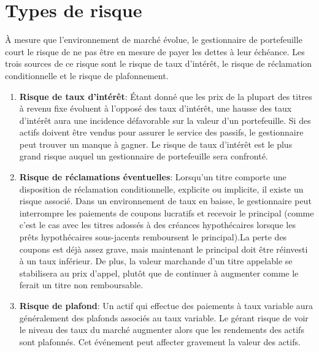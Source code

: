 \documentclass[12pt]{article}
\begin{document}
\section{Types de risque}
À mesure que l'environnement de marché évolue, le gestionnaire de portefeuille court le risque de ne pas être en mesure de payer les dettes à leur échéance. Les trois sources de ce risque sont le risque de taux d'intérêt, le risque de réclamation conditionnelle et le risque de plafonnement.
\begin{enumerate}
\item \textbf{Risque de taux d'intérêt}: Étant donné que les prix de la plupart des titres à revenu fixe évoluent à l'opposé des taux d'intérêt, une hausse des taux d'intérêt aura une incidence défavorable sur la valeur d'un portefeuille. Si des actifs doivent être vendus pour assurer le service des passifs, le gestionnaire peut trouver un manque à gagner. Le risque de taux d'intérêt est le plus grand risque auquel un gestionnaire de portefeuille sera confronté.
\item \textbf{Risque de réclamations éventuelles}: Lorsqu'un titre comporte une disposition de réclamation conditionnelle, explicite ou implicite, il existe un risque associé. Dans un environnement de taux en baisse, le gestionnaire peut interrompre les paiements de coupons lucratifs et recevoir le principal (comme c'est le cas avec les titres adossés à des créances hypothécaires lorsque les prêts hypothécaires sous-jacents remboursent le principal).La perte des coupons est déjà assez grave, mais maintenant le principal doit être réinvesti à un taux inférieur. De plus, la valeur marchande d'un titre appelable se stabilisera au prix d'appel, plutôt que de continuer à augmenter comme le ferait un titre non remboursable.
\item \textbf{Risque de plafond}: Un actif qui effectue des paiements à taux variable aura généralement des plafonds associés au taux variable. Le gérant risque de voir le niveau des taux du marché augmenter alors que les rendements des actifs sont plafonnés. Cet événement peut affecter gravement la valeur des actifs.
\end{enumerate}
\end{document}
